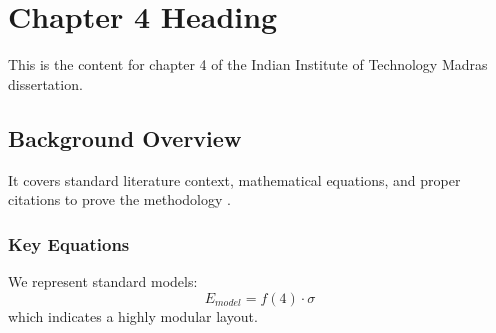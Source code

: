 \chapter{Chapter 4 Heading}
\label{ch:chapter4}
This is the content for chapter 4 of the Indian Institute of Technology Madras dissertation.

\section{Background Overview}
It covers standard literature context, mathematical equations, and proper citations to prove the methodology \cite{texbook}.

\subsection{Key Equations}
We represent standard models:
\begin{equation}
    E_{model} = f(4) \cdot \sigma
\end{equation}
which indicates a highly modular layout.
